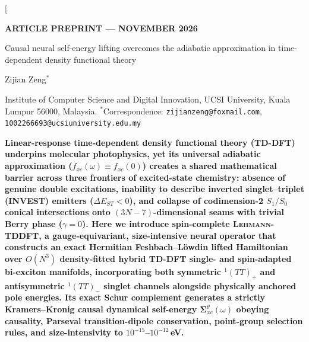 \documentclass[10pt,twocolumn]{article}
\theoremstyle{natthm}
\newcommand{\leh}{\textsc{Lehmann-TDDFT}}
\newcommand{\dEST}{\Delta E_{ST}}
\newcommand{\Sig}{\mathbf{\Sigma}_{xc}^{\theta}}
\begin{document}
\twocolumn[{%
  \vspace*{-0.26in}
  {\sffamily\bfseries\fontsize{8}{9.5}\selectfont\color{natblue} ARTICLE \hfill PREPRINT --- NOVEMBER 2026}\par
  \vspace{6pt}
  {\sffamily\bfseries\fontsize{15.8}{19.4}\selectfont\color{natdark}\raggedright
  Causal neural self-energy lifting overcomes the adiabatic approximation in time-dependent density functional theory\par}
  \vspace{7pt}
  {\sffamily\fontsize{9.5}{11.5}\selectfont\color{natdark}
  Zijian Zeng$^{*}$\par}
  \vspace{2pt}
  {\sffamily\fontsize{7.8}{9.5}\selectfont\color{natgray}
  Institute of Computer Science and Digital Innovation, UCSI University, Kuala Lumpur 56000, Malaysia.\quad
  $^{*}$Correspondence: \texttt{zijianzeng@foxmail.com}, \texttt{1002266693@ucsiuniversity.edu.my}\par}
  \vspace{8pt}
  \noindent\colorbox{natbg}{%
    \parbox{\dimexpr\textwidth-2\fboxsep\relax}{%
      \vspace{3pt}
      \sffamily\fontsize{8.65}{11.1}\selectfont\color{natdark}\textbf{%
      Linear-response time-dependent density functional theory (TD-DFT) underpins molecular photophysics, yet its universal adiabatic approximation ($f_{xc}(\omega)\equiv f_{xc}(0)$) creates a shared mathematical barrier across three frontiers of excited-state chemistry: absence of genuine double excitations, inability to describe inverted singlet--triplet (INVEST) emitters ($\dEST<0$), and collapse of codimension-2 $S_1/S_0$ conical intersections onto $(3N{-}7)$-dimensional seams with trivial Berry phase ($\gamma=0$).
      Here we introduce spin-complete \leh{}, a gauge-equivariant, size-intensive neural operator that constructs an exact Hermitian Feshbach--L\"owdin lifted Hamiltonian over $O(N^3)$ density-fitted hybrid TD-DFT single- and spin-adapted bi-exciton manifolds, incorporating both symmetric $^1(TT)_+$ and antisymmetric $^1(TT)_-$ singlet channels alongside physically anchored pole energies.
      Its exact Schur complement generates a strictly Kramers--Kronig causal dynamical self-energy $\Sig(\omega)$ obeying causality, Parseval transition-dipole conservation, point-group selection rules, and size-intensivity to $10^{-15}$--$10^{-12}$\,eV.
}}}}
\end{document}
